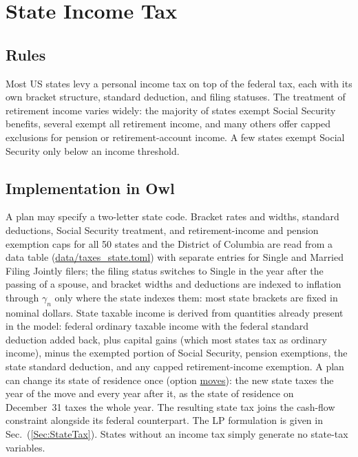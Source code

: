 \documentclass[fleqn,12pt]{report}
\newcommand{\code}[1]{\url{#1}}
\begin{document}
\section{State Income Tax}

\subsection*{Rules}
Most US states levy a personal income tax on top of the federal tax, each with
its own bracket structure, standard deduction, and filing statuses.
The treatment of retirement income varies widely: the majority of states exempt
Social Security benefits, several exempt all retirement income, and many others
offer capped exclusions for pension or retirement-account income.
A few states exempt Social Security only below an income threshold.

\subsection*{Implementation in Owl}
A plan may specify a two-letter state code.
Bracket rates and widths, standard deductions, Social Security treatment, and
retirement-income and pension exemption caps for all 50 states and the District
of Columbia are read from a data table (\code{data/taxes_state.toml}) with
separate entries for Single and Married Filing Jointly filers; the filing
status switches to Single in the year after the passing of a spouse, and bracket
widths and deductions are indexed to inflation through $\gamma_n$ only where the
state indexes them: most state brackets are fixed in nominal dollars.
State taxable income is derived from quantities already present in the model:
federal ordinary taxable income with the federal standard deduction added back,
plus capital gains (which most states tax as
ordinary income), minus the exempted portion of Social Security, pension
exemptions, the state standard deduction, and any capped retirement-income
exemption.
A plan can change its state of residence once (option \code{moves}): the new
state taxes the year of the move and every year after it, as the state of
residence on December~31 taxes the whole year.
The resulting state tax joins the cash-flow constraint alongside its federal
counterpart.
The LP formulation is given in Sec.~(\ref{Sec:StateTax}).
States without an income tax simply generate no state-tax variables.
\end{document}
